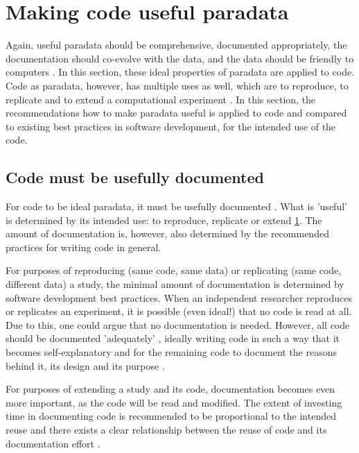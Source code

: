 \section{Making code useful paradata}\label{sec:making-code-useful-paradata}

Again, useful paradata should be comprehensive, 
documented appropriately, the documentation should co-evolve with the data,
and the data should be friendly to computers \cite{huvila2022improving}.
In this section, these ideal properties of paradata are applied to code.
Code as paradata, however, has multiple uses as well,
which are to reproduce, to replicate and to 
extend a computational experiment \cite{benureau2018re}.
In this section, the recommendations how to make paradata useful
is applied to code and compared to existing best practices in software 
development, for the intended use of the code.

\subsection{Code must be usefully documented}

For code to be ideal paradata, it must be usefully documented \cite{huvila2022improving}.
What is 'useful' is determined by its intended use: 
to reproduce, replicate or extend \ref{sec:making-code-useful-paradata}.
The amount of documentation is, however, also determined
by the recommended practices for writing code in general. 

For purposes of reproducing (same code, same data) or replicating (same code,
different data) a study, the minimal amount of documentation
is determined by software development best practices.
When an independent researcher reproduces or replicates an experiment, 
it is possible (even ideal!) that no code is read at all.
Due to this, one could argue that no documentation is needed.
However, all code should be documented 'adequately' \cite{peng2006reproducible},
ideally writing code in such a way that it becomes 
self-explanatory \cite{wilson2014best}
and for the remaining code to document the reasons behind it, 
its design and its purpose \cite{wilson2014best}.

For purposes of extending a study and its code, 
documentation becomes even more important,
as the code will be read and modified.
The extent of investing time in documenting code is recommended
to be proportional to the intended reuse \cite{pianosi2020successfully}
and there exists a clear relationship between the reuse 
of code and its documentation 
effort \cite{cosentino2017systematic,hata2015characteristics}.

